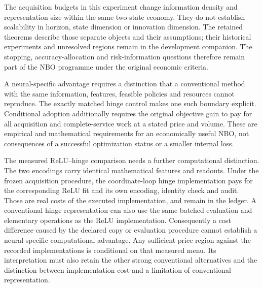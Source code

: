 The acquisition budgets in this experiment change information density and
representation size within the same two-state economy. They do not establish
scalability in horizon, state dimension or innovation dimension. The retained
theorems describe those separate objects and their assumptions; their
historical experiments and unresolved regions remain in the development
companion. The stopping, accuracy-allocation and risk-information questions
therefore remain part of the NBO programme under the original economic
criteria.

A neural-specific advantage requires a distinction that a conventional
method with the same information, features, feasible policies and resources
cannot reproduce. The exactly matched hinge control makes one such boundary
explicit. Conditional adoption additionally requires the original objective
gain to pay for all acquisition and complete-service work at a stated price
and volume. These are empirical and mathematical requirements for an
economically useful NBO, not consequences of a successful optimization status
or a smaller internal loss.

The measured ReLU--hinge comparison needs a further computational distinction.
The two encodings carry identical mathematical features and readouts. Under
the frozen acquisition procedure, the coordinate-loop hinge implementation
pays for the corresponding ReLU fit and its own encoding, identity check and
audit. Those are real costs of the executed implementation, and remain in the
ledger. A conventional hinge representation can also use the same batched
evaluation and elementary operations as the ReLU implementation. Consequently
a cost difference caused by the declared copy or evaluation procedure cannot
establish a neural-specific computational advantage. Any sufficient price
region against the recorded implementations is conditional on that measured
menu. Its interpretation must also retain the other strong conventional
alternatives and the distinction between implementation cost and a limitation
of conventional representation.
